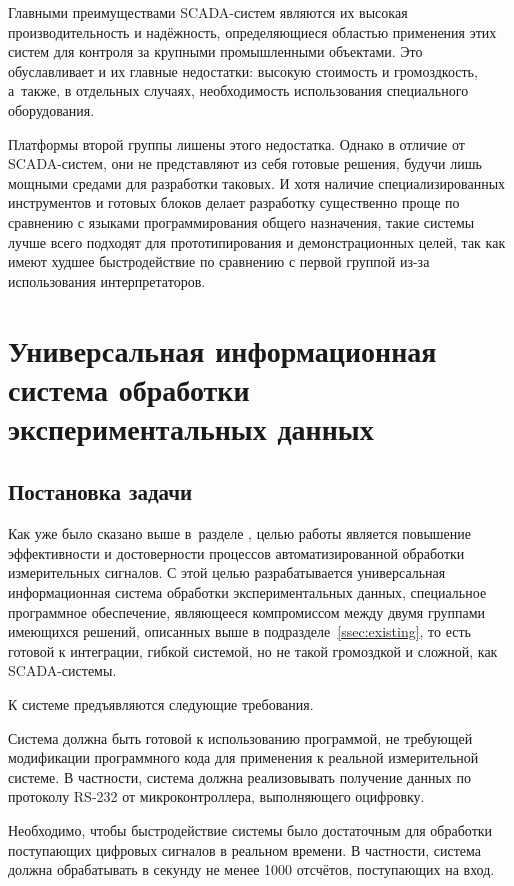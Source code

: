 \documentclass[a4paper, 14pt, titlepage]{extarticle}
\let\oldsection\section
\renewcommand{\section}{\newpage\oldsection}
\begin{document}
  Главными преимуществами SCADA-систем являются их высокая производительность и надёжность,
  определяющиеся областью применения этих систем для контроля за крупными промышленными объектами.
  Это обуславливает и их главные недостатки: высокую стоимость и громоздкость, а~также, в отдельных
  случаях, необходимость использования специального оборудования.

  Платформы второй группы лишены этого недостатка. Однако в отличие от SCADA-систем, они не
  представляют из себя готовые решения, будучи лишь мощными средами для разработки таковых.
  И хотя наличие специализированных инструментов и готовых блоков делает разработку существенно
  проще по сравнению с языками программирования общего назначения, такие системы лучше всего
  подходят для прототипирования и демонстрационных целей, так как имеют худшее быстродействие по
  сравнению с первой группой из-за использования интерпретаторов.

  \section{Универсальная информационная система обработки экспериментальных данных}

  \subsection{Постановка задачи}\label{ssec:task}

  Как уже было сказано выше в~разделе ,
  целью работы является повышение эффективности и достоверности процессов автоматизированной
  обработки измерительных сигналов. С этой целью разрабатывается универсальная информационная
  система обработки экспериментальных данных,
  специальное программное обеспечение,
  являющееся компромиссом между двумя группами имеющихся решений, описанных выше в
  подразделе~\ref{ssec:existing}, то есть готовой к интеграции, гибкой системой, но не такой
  громоздкой и сложной, как SCADA-системы.

  К системе предъявляются следующие требования.

  Система должна быть готовой к использованию программой, не требующей модификации программного кода
  для применения к реальной измерительной системе. В частности, система должна реализовывать
  получение данных по протоколу RS-232\cite{sweet-serial} от микроконтроллера, выполняющего оцифровку.

  Необходимо, чтобы быстродействие системы было достаточным для обработки поступающих цифровых
  сигналов в реальном времени. В частности, система должна обрабатывать в секунду не менее 1000
  отсчётов, поступающих на вход.
\end{document}
